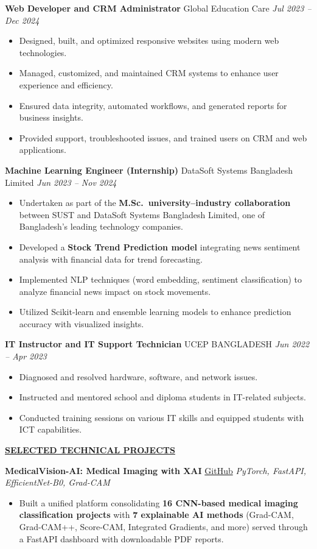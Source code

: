 \documentclass[10pt,letterpaper]{article}
\newcommand{\sectiontitle}[1]{\vspace{3pt}\noindent\underline{\textbf{#1}}\vspace{2pt}\par}
\newcommand{\jobheader}[3]{\textbf{#1} \; \textbar \; #2 \hfill \textit{#3}\par\vspace{1pt}}
\begin{document}
\jobheader{Web Developer and CRM Administrator}{Global Education Care}{Jul 2023 -- Dec 2024}
\begin{itemize}
  \item Designed, built, and optimized responsive websites using modern web technologies.
  \item Managed, customized, and maintained CRM systems to enhance user experience and efficiency.
  \item Ensured data integrity, automated workflows, and generated reports for business insights.
  \item Provided support, troubleshooted issues, and trained users on CRM and web applications.
\end{itemize}

\jobheader{Machine Learning Engineer (Internship)}{DataSoft Systems Bangladesh Limited}{Jun 2023 -- Nov 2024}
\begin{itemize}
  \item Undertaken as part of the \textbf{M.Sc.\ university--industry collaboration} between SUST and DataSoft Systems Bangladesh Limited, one of Bangladesh's leading technology companies.
  \item Developed a \textbf{Stock Trend Prediction model} integrating news sentiment analysis with financial data for trend forecasting.
  \item Implemented NLP techniques (word embedding, sentiment classification) to analyze financial news impact on stock movements.
  \item Utilized Scikit-learn and ensemble learning models to enhance prediction accuracy with visualized insights.
\end{itemize}

\jobheader{IT Instructor and IT Support Technician}{UCEP BANGLADESH}{Jun 2022 -- Apr 2023}
\begin{itemize}
  \item Diagnosed and resolved hardware, software, and network issues.
  \item Instructed and mentored school and diploma students in IT-related subjects.
  \item Conducted training sessions on various IT skills and equipped students with ICT capabilities.
\end{itemize}

\sectiontitle{SELECTED TECHNICAL PROJECTS}

\textbf{MedicalVision-AI: Medical Imaging with XAI} \;\textbar\;\href{https://github.com/nakib33/MedicalVision-AI}{GitHub} \;\textbar\;\textit{PyTorch, FastAPI, EfficientNet-B0, Grad-CAM}
\begin{itemize}
  \item Built a unified platform consolidating \textbf{16 CNN-based medical imaging classification projects} with \textbf{7 explainable AI methods} (Grad-CAM, Grad-CAM++, Score-CAM, Integrated Gradients, and more) served through a FastAPI dashboard with downloadable PDF reports.
\end{itemize}
\end{document}
